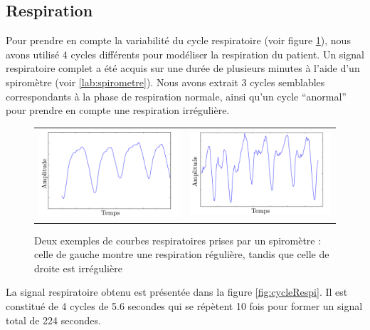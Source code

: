 		\subsection{Respiration}


Pour prendre en compte la variabilité du cycle respiratoire (voir figure \ref{fig:variabCycle}), nous avons utilisé 4 cycles différents pour modéliser la respiration du patient. Un signal respiratoire complet a été acquis sur une durée de plusieurs minutes à l'aide d'un spiromètre (voir \ref{lab:spirometre}). Nous avons extrait 3 cycles semblables correspondants à la phase de respiration normale, ainsi qu'un cycle ``anormal'' pour prendre en compte une respiration irrégulière.

\begin{figure}
 \centering
 \begin{tabular}{c c}
 \includegraphics[width=8cm]{images/respiReguliere} &
 \includegraphics[width=8cm]{images/respiIrreguliere}
 \end{tabular}
 \caption[Exemple de courbes respiratoires régulière et irrégulière]{Deux exemples de courbes respiratoires prises par un spiromètre : celle de gauche montre une respiration régulière, tandis que celle de droite est irrégulière}
 \label{fig:variabCycle}
\end{figure}


La signal respiratoire obtenu est présentée dans la figure \ref{fig:cycleRespi}. Il est constitué de 4 cycles de 5.6 secondes qui se répètent 10 fois pour former un signal total de 224 secondes. 

